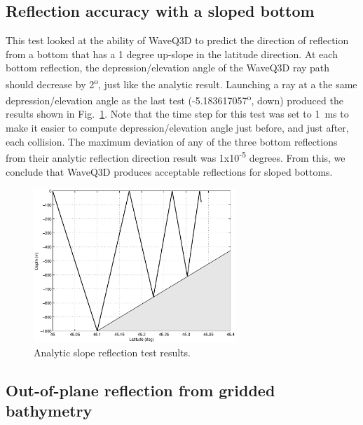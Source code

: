 \documentclass{ws-jca}
\begin{document}
\subsection{Reflection accuracy with a sloped bottom}

This test looked at the ability of WaveQ3D to predict the direction of
reflection from a bottom that has a 1 degree up-slope in the latitude
direction. At each bottom reflection, the depression/elevation angle of the
WaveQ3D ray path should decrease by 2\textsuperscript{o}, just like the
analytic result. Launching a ray at a the same depression/elevation angle
as the last test (-5.183617057\textsuperscript{o}, down) produced the
results shown in Fig.~\ref{fig:reflect_slope_test}. Note that the time step
for this test was set to 1~ms to make it easier to compute
depression/elevation angle just before, and just after, each collision. The
maximum deviation of any of the three bottom reflections from their
analytic reflection direction result was 1x10\textsuperscript{-5} degrees.
From this, we conclude that WaveQ3D produces acceptable reflections for
sloped bottoms.
\begin{figure}[th]
	\centerline{\includegraphics[width=3in]{reflect_slope_test.eps}} 
	\vspace*{8pt}
	\caption{Analytic slope reflection test results. 
	\label{fig:reflect_slope_test}}
\end{figure}

\subsection{Out-of-plane reflection from gridded bathymetry}
\end{document}
